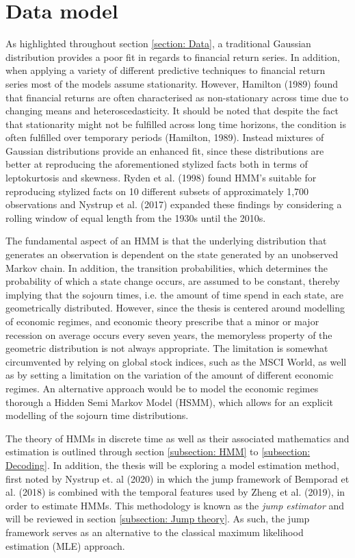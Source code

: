 \newpage
 \section{Data model}
As highlighted throughout section \ref{section: Data}, a traditional Gaussian distribution provides a poor fit in regards to financial return series. In addition, when applying a variety of different predictive techniques to financial return series most of the models assume stationarity. However, Hamilton (1989) found that financial returns are often characterised as non-stationary across time due to changing means and heteroscedasticity. It should be noted that despite the fact that stationarity might not be fulfilled across long time horizons, the condition is often fulfilled over temporary periods (Hamilton, 1989). Instead mixtures of Gaussian distributions provide an enhanced fit, since these distributions are better at reproducing the aforementioned stylized facts both in terms of leptokurtosis and skewness. Ryden et al. (1998) found HMM's suitable for reproducing stylized facts on 10 different subsets of approximately 1,700 observations and Nystrup et al. (2017) expanded these findings by considering a rolling window of equal length from the 1930s until the 2010s.

The fundamental aspect of an HMM is that the underlying distribution that generates an observation is dependent on the state generated by an unobserved Markov chain. In addition, the transition probabilities, which determines the probability of which a state change occurs, are assumed to be constant, thereby implying that the sojourn times, i.e. the amount of time spend in each state, are geometrically distributed. However, since the thesis is centered around modelling of economic regimes, and economic theory prescribe that a minor or major recession on average occurs every seven years, the memoryless property of the geometric distribution is not always appropriate. The limitation is somewhat circumvented by relying on global stock indices, such as the MSCI World, as well as by setting a limitation on the variation of the amount of different economic regimes. An alternative approach would be to model the economic regimes thorough a Hidden Semi Markov Model (HSMM), which allows for an explicit modelling of the sojourn time distributions. 

The theory of HMMs in discrete time as well as their associated mathematics and estimation is outlined through section \ref{subsection: HMM} to \ref{subsection: Decoding}. In addition, the thesis will be exploring a model estimation method, first noted by Nystrup et. al (2020) in which the jump framework of Bemporad et al. (2018) is combined with the temporal features used by Zheng et al. (2019), in order to estimate HMMs. This methodology is known as the \textit{jump estimator} and will be reviewed in section \ref{subsection: Jump theory}. As such, the jump framework serves as an alternative to the classical maximum likelihood estimation (MLE) approach. 



